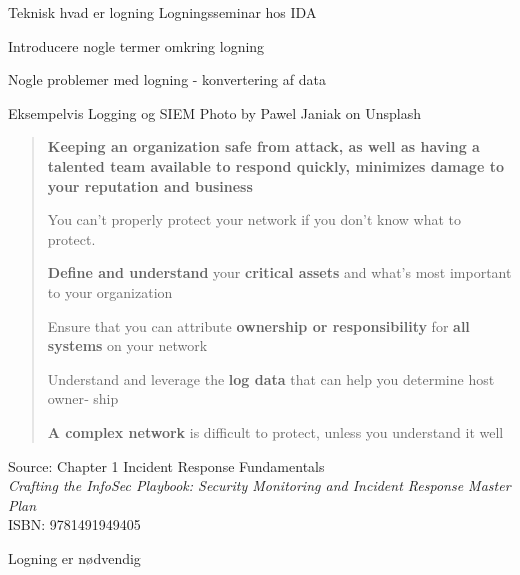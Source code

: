 \documentclass[Screen16to9,17pt]{foils}
\begin{document}
\mytitlepage
{Teknisk hvad er logning}
{Logningsseminar hos IDA}

\hlkprofil




\begin{list2}
\item Introducere nogle termer omkring logning
\item Nogle problemer med logning - konvertering af data
\item Eksempelvis Logging og SIEM \hskip 10cm {\small  Photo by Pawel Janiak on Unsplash}
\end{list2}







\begin{quote}
\begin{list2}
\item {\bf Keeping an organization safe from attack, as well as having a talented team available to respond quickly, minimizes damage to your reputation and business}
\item You can’t properly protect your network if you don’t know what to protect.
\item {\bf Define and understand} your {\bf critical assets} and what’s most important to your
  organization
\item Ensure that you can attribute {\bf ownership or responsibility} for {\bf all systems} on your
  network
\item Understand and leverage the {\bf log data} that can help you determine host owner‐
  ship
\item {\bf A complex network} is difficult to protect, unless you understand it well
\end{list2}
\end{quote}
Source: Chapter 1 Incident Response Fundamentals\\
\emph{Crafting the InfoSec Playbook: Security Monitoring and Incident Response Master Plan}\\ ISBN: 9781491949405

\vskip 5mm
\centerline{\Large Logning er nødvendig}




\end{document}
